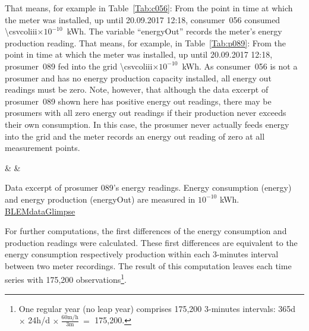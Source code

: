 \noindent That means, for example in Table~\ref{Tab:c056}: From the point in time at which the meter was installed, up until 20.09.2017 12:18, consumer~056 consumed %
{\num{\csvcoliii}}$\times 10^{-10}$~kWh. The variable ``energyOut'' records the meter's energy production reading. That means, for example, in Table~\ref{Tab:p089}: From the point in time at which the meter was installed, up until 20.09.2017 12:18, prosumer~089 fed into the grid %
{\num{\csvcoliii}}$\times10^{-10}$~kWh. As consumer~056 is not a prosumer and has no energy production capacity installed, all energy out readings must be zero. Note, however, that although the data excerpt of prosumer~089 shown here has positive energy out readings, there may be prosumers with all zero energy out readings if their production never exceeds their own consumption. In this case, the prosumer never actually feeds energy into the grid and the meter records an energy out reading of zero at all measurement points.
%
\begin{table}[htbp]
    {\csvcolii & \csvcoliii & \csvcoliv}%
    \caption[Data excerpt of prosumer~089's energy readings]{Data excerpt of prosumer 089's energy readings. Energy consumption (energy) and energy production (energyOut) are measured in $10^{-10}$ kWh. \quantnet\href{https://github.com/QuantLet/BLEM/tree/master/BLEMdataGlimpse}{BLEMdataGlimpse}}
    \label{Tab:p089}
\end{table}
%

For further computations, the first differences of the energy consumption and production readings were calculated. These first differences are equivalent to the energy consumption respectively production within each 3-minutes interval between two meter recordings. The result of this computation leaves each time series with 175,200 observations\footnote{One regular year (no leap year) comprises 175,200 3-minutes intervals: 365d $\times$ 24h/d $\times~\frac{60\text{m/h}}{3\text{m}}~=$ 175,200.}.



